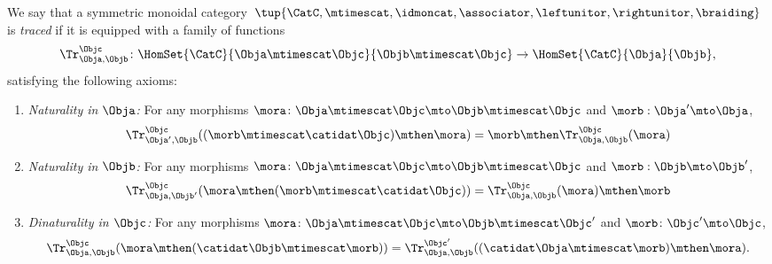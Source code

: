 \begin{ctdefinition}
    \label{def:traced-monoidal-cat}
    \label{def:traced-monoidal-category}
    We say that a symmetric monoidal category~$\tup{\CatC,\mtimescat, \idmoncat, \associator, \leftunitor, \rightunitor, \braiding}$ is \emph{traced} if it is equipped with a family of functions
    \begin{equation}
        \Tr_{\Obja,\Objb}^\Objc\colon \HomSet{\CatC}{\Obja \mtimescat \Objc}{\Objb\mtimescat \Objc}\to \HomSet{\CatC}{\Obja}{\Objb},
    \end{equation}
    satisfying the following axioms:
    \begin{enumerate}
        \item \emph{Naturality in $\Obja$:} For any morphisms $\mora\colon \Obja\mtimescat \Objc \mto \Objb\mtimescat \Objc$ and $\morb : \Obja' \mto \Obja$,
              \begin{equation}
                  \Tr_{\Obja', \Objb}^\Objc ( (\morb \mtimescat \catidat\Objc) \mthen \mora) = \morb \mthen \Tr_{\Obja, \Objb}^\Objc (\mora)
              \end{equation}
        \item \emph{Naturality in $\Objb$:} For any morphisms $\mora\colon \Obja\mtimescat \Objc \mto \Objb\mtimescat \Objc$ and $\morb : \Objb \mto \Objb'$,
              \begin{equation}
                  \Tr_{\Obja, \Objb'}^\Objc ( \mora \mthen (\morb \mtimescat \catidat\Objc) ) =  \Tr_{\Obja, \Objb}^\Objc (\mora) \mthen \morb
              \end{equation}
        \item \emph{Dinaturality in $\Objc$:} For any morphisms $\mora \colon \Obja \mtimescat \Objc \mto \Objb \mtimescat \Objc'$ and $\morb \colon \Objc' \mto \Objc$,
              \begin{equation}
                  \Tr_{\Obja, \Objb}^{\Objc} (\mora \mthen (\catidat\Objb \mtimescat \morb)) = \Tr_{\Obja, \Objb}^{\Objc'}((\catidat\Obja \mtimescat \morb) \mthen \mora).
              \end{equation}


\end{enumerate}
\end{ctdefinition}
